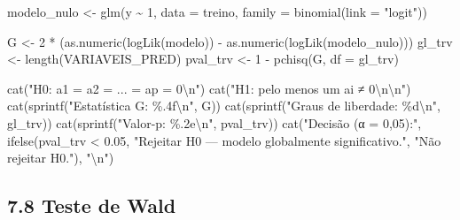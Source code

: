 \documentclass[
  letterpaper,
  DIV=11,
  numbers=noendperiod]{scrartcl}
\newenvironment{Shaded}{\begin{snugshade}}{\end{snugshade}}
\newcommand{\AttributeTok}[1]{\textcolor[rgb]{0.40,0.45,0.13}{#1}}
\newcommand{\DecValTok}[1]{\textcolor[rgb]{0.68,0.00,0.00}{#1}}
\newcommand{\FloatTok}[1]{\textcolor[rgb]{0.68,0.00,0.00}{#1}}
\newcommand{\FunctionTok}[1]{\textcolor[rgb]{0.28,0.35,0.67}{#1}}
\newcommand{\NormalTok}[1]{\textcolor[rgb]{0.00,0.23,0.31}{#1}}
\newcommand{\OtherTok}[1]{\textcolor[rgb]{0.00,0.23,0.31}{#1}}
\newcommand{\SpecialCharTok}[1]{\textcolor[rgb]{0.37,0.37,0.37}{#1}}
\newcommand{\StringTok}[1]{\textcolor[rgb]{0.13,0.47,0.30}{#1}}
\begin{document}
\begin{Shaded}
\begin{Highlighting}[]
\NormalTok{modelo\_nulo }\OtherTok{\textless{}{-}} \FunctionTok{glm}\NormalTok{(y }\SpecialCharTok{\textasciitilde{}} \DecValTok{1}\NormalTok{, }\AttributeTok{data =}\NormalTok{ treino, }\AttributeTok{family =} \FunctionTok{binomial}\NormalTok{(}\AttributeTok{link =} \StringTok{"logit"}\NormalTok{))}

\NormalTok{G        }\OtherTok{\textless{}{-}} \DecValTok{2} \SpecialCharTok{*}\NormalTok{ (}\FunctionTok{as.numeric}\NormalTok{(}\FunctionTok{logLik}\NormalTok{(modelo)) }\SpecialCharTok{{-}} \FunctionTok{as.numeric}\NormalTok{(}\FunctionTok{logLik}\NormalTok{(modelo\_nulo)))}
\NormalTok{gl\_trv   }\OtherTok{\textless{}{-}} \FunctionTok{length}\NormalTok{(VARIAVEIS\_PRED)}
\NormalTok{pval\_trv }\OtherTok{\textless{}{-}} \DecValTok{1} \SpecialCharTok{{-}} \FunctionTok{pchisq}\NormalTok{(G, }\AttributeTok{df =}\NormalTok{ gl\_trv)}

\FunctionTok{cat}\NormalTok{(}\StringTok{"H0: a1 = a2 = ... = ap = 0}\SpecialCharTok{\textbackslash{}n}\StringTok{"}\NormalTok{)}
\FunctionTok{cat}\NormalTok{(}\StringTok{"H1: pelo menos um ai ≠ 0}\SpecialCharTok{\textbackslash{}n\textbackslash{}n}\StringTok{"}\NormalTok{)}
\FunctionTok{cat}\NormalTok{(}\FunctionTok{sprintf}\NormalTok{(}\StringTok{"Estatística G:      \%.4f}\SpecialCharTok{\textbackslash{}n}\StringTok{"}\NormalTok{, G))}
\FunctionTok{cat}\NormalTok{(}\FunctionTok{sprintf}\NormalTok{(}\StringTok{"Graus de liberdade: \%d}\SpecialCharTok{\textbackslash{}n}\StringTok{"}\NormalTok{,   gl\_trv))}
\FunctionTok{cat}\NormalTok{(}\FunctionTok{sprintf}\NormalTok{(}\StringTok{"Valor{-}p:            \%.2e}\SpecialCharTok{\textbackslash{}n}\StringTok{"}\NormalTok{, pval\_trv))}
\FunctionTok{cat}\NormalTok{(}\StringTok{"Decisão (α = 0,05):"}\NormalTok{,}
    \FunctionTok{ifelse}\NormalTok{(pval\_trv }\SpecialCharTok{\textless{}} \FloatTok{0.05}\NormalTok{,}
           \StringTok{"Rejeitar H0 — modelo globalmente significativo."}\NormalTok{,}
           \StringTok{"Não rejeitar H0."}\NormalTok{), }\StringTok{"}\SpecialCharTok{\textbackslash{}n}\StringTok{"}\NormalTok{)}
\end{Highlighting}
\end{Shaded}

\subsection{7.8 Teste de Wald}\label{teste-de-wald}
\end{document}
